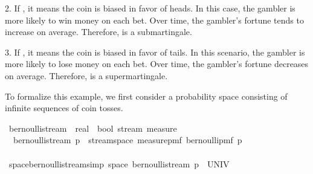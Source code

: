 \begin{isabellebody}
\begin{isamarkuptext}
2. If  , it means the coin is biased in favor of heads. In this case, the gambler is more likely to win money on each bet. 
      Over time, the gambler’s fortune tends to increase on average. 
      Therefore,  is a submartingale.%
\end{isamarkuptext}\isamarkuptrue%
%
\begin{isamarkuptext}%
3. If  , it means the coin is biased in favor of tails. In this scenario, the gambler is more likely to lose money on each bet. 
      Over time, the gambler’s fortune decreases on average. 
      Therefore,  is a supermartingale.%
\end{isamarkuptext}\isamarkuptrue%
%
\begin{isamarkuptext}%
To formalize this example, we first consider a probability space consisting of infinite sequences of coin tosses.%
\end{isamarkuptext}\isamarkuptrue%
\isamarkupfalse%
\ bernoulli{\isacharunderscore}{\kern0pt}stream\ {\isacharcolon}{\kern0pt}{\isacharcolon}{\kern0pt}\ {\isachardoublequoteopen}real\ {\isasymRightarrow}\ {\isacharparenleft}{\kern0pt}bool\ stream{\isacharparenright}{\kern0pt}\ measure{\isachardoublequoteclose}\ \isanewline
\ \ {\isachardoublequoteopen}bernoulli{\isacharunderscore}{\kern0pt}stream\ p\ {\isacharequal}{\kern0pt}\ stream{\isacharunderscore}{\kern0pt}space\ {\isacharparenleft}{\kern0pt}measure{\isacharunderscore}{\kern0pt}pmf\ {\isacharparenleft}{\kern0pt}bernoulli{\isacharunderscore}{\kern0pt}pmf\ p{\isacharparenright}{\kern0pt}{\isacharparenright}{\kern0pt}{\isachardoublequoteclose}\isanewline
\ \ \ \ \ \ \ \ \ \ \ \ \ \ \ \ \ \ \ \ \ \ \ \ \ \ \ \ \ \ \ \ \ \ \isanewline
{}\isamarkupfalse%
\ space{\isacharunderscore}{\kern0pt}bernoulli{\isacharunderscore}{\kern0pt}stream{\isacharbrackleft}{\kern0pt}simp{\isacharbrackright}{\kern0pt}{\isacharcolon}{\kern0pt}\ {\isachardoublequoteopen}space\ {\isacharparenleft}{\kern0pt}bernoulli{\isacharunderscore}{\kern0pt}stream\ p{\isacharparenright}{\kern0pt}\ {\isacharequal}{\kern0pt}\ UNIV{\isachardoublequoteclose}%
\isadelimproof
\ %
\endisadelimproof

\end{isabellebody}
